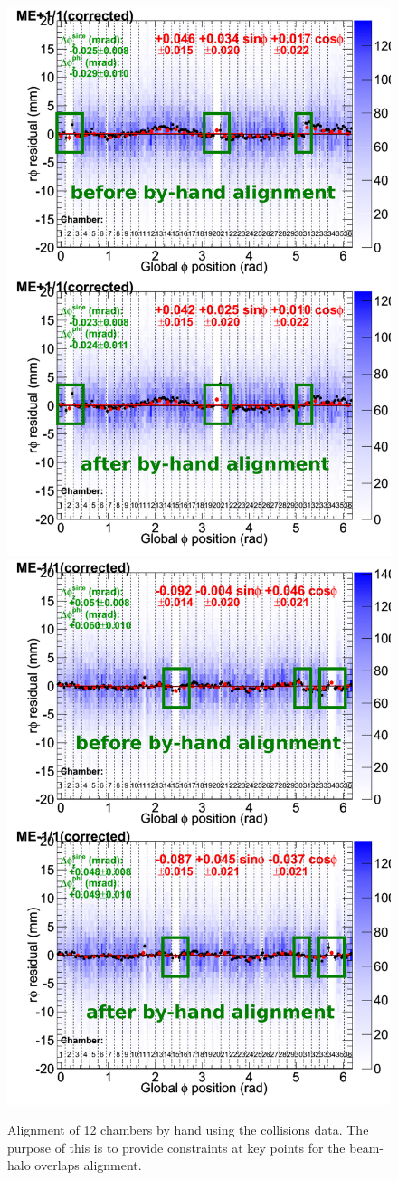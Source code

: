 \documentclass[12pt]{article}
\begin{document}
\begin{figure}
\includegraphics[width=0.5\linewidth]{byhand_mep11.pdf}
\includegraphics[width=0.5\linewidth]{byhand_mem11.pdf}

\caption{Alignment of 12 chambers by hand using the collisions data.
  The purpose of this is to provide constraints at key points for the
  beam-halo overlaps alignment. \label{fig:byhand}}
\end{figure}
\end{document}
